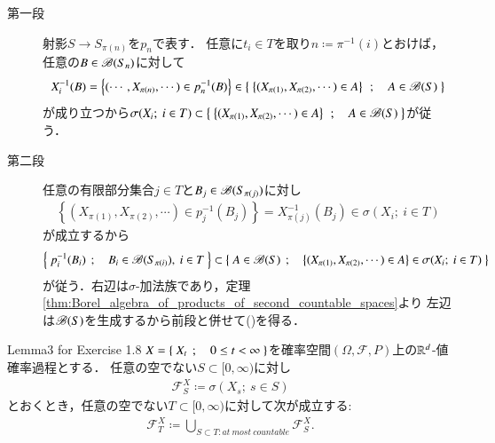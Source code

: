 \begin{prf}\mbox{}
	\begin{description}
		\item[第一段]
			射影$S \longrightarrow S_{\pi(n)}$を$p_n$で表す．
			任意に$t_i \in T$を取り$n \coloneqq \pi^{-1}(i)$とおけば，
			任意の$B \in \mathscr{B}(S_n)$に対して
			\begin{align}
				X_i^{-1}(B) = \left\{ (\cdots, X_{\pi(n)},\cdots) \in p_n^{-1}(B) \right\} \in \left\{\ \left\{ (X_{\pi(1)}, X_{\pi(2)},\cdots) \in A \right\}\ \, ; \quad A \in \mathscr{B}(S)\ \right\}
			\end{align}
			が成り立つから$\sigma(X_i;\ i \in T) \subset 
			\left\{\ \left\{ (X_{\pi(1)}, X_{\pi(2)},\cdots) \in A \right\}\ \, ; \quad A \in \mathscr{B}(S)\ \right\}$が従う．
		
		\item[第二段]
			任意の有限部分集合$j \in T$と$B_j \in \mathscr{B}(S_{\pi(j)})$に対し
			\begin{align}
				\left\{ (X_{\pi(1)}, X_{\pi(2)},\cdots) \in p_j^{-1}(B_j) \right\}
				= X_{\pi(j)}^{-1}(B_j)
				\in \sigma(X_i;\ i \in T)
			\end{align}
			が成立するから
			\begin{align}
				\left\{\ p_i^{-1}(B_i)\ \, ; \quad B_i \in \mathscr{B}(S_{\pi(i)}),\ i \in T\ \right\}
				\subset \left\{\ A \in \mathscr{B}(S)\ \, ; \quad \left\{ (X_{\pi(1)}, X_{\pi(2)},\cdots) \in A \right\} \in \sigma(X_i;\ i \in T)\ \right\}
			\end{align}
			が従う．右辺は$\sigma$-加法族であり，定理\ref{thm:Borel_algebra_of_products_of_second_countable_spaces}より
			左辺は$\mathscr{B}(S)$を生成するから前段と併せて()を得る．
			\QED
	\end{description}
\end{prf}

\begin{itembox}[l]{Lemma3 for Exercise 1.8}
	$X = \left\{\ X_t\ \, ; \quad 0 \leq t < \infty\ \right\}$を確率空間$(\Omega,\mathscr{F},P)$上の$\mathbb{R}^d$-値確率過程とする．
	任意の空でない$S \subset [0,\infty)$に対し
	\begin{align}
		\mathcal{F}^X_S \coloneqq \sigma(X_s;\ s \in S)
	\end{align}
	とおくとき，任意の空でない$T \subset [0,\infty)$に対して次が成立する:
	\begin{align}
		\mathcal{F}^X_T \coloneqq \bigcup_{S \subset T:at\ most\ countable} \mathcal{F}^X_S.
		\label{eq:lem3_for_chap_1_exercise_1_8_1}
	\end{align}
\end{itembox}

